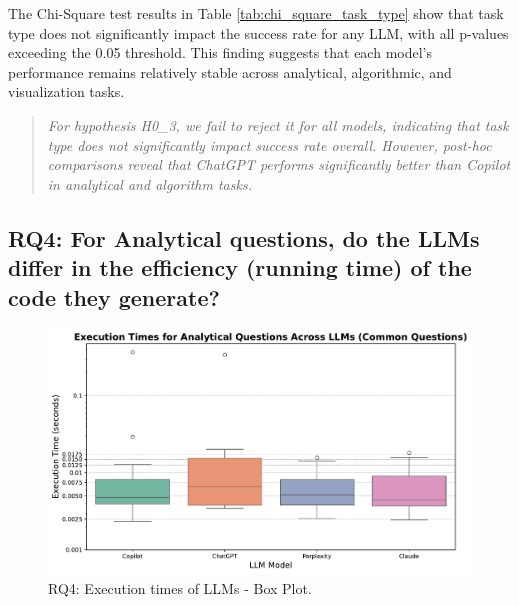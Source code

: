 \documentclass[conference]{IEEEtran}
\begin{document}
The Chi-Square test results in Table \ref{tab:chi_square_task_type} show that task type does not significantly impact the success rate for any LLM, with all p-values exceeding the 0.05 threshold. This finding suggests that each model’s performance remains relatively stable across analytical, algorithmic, and visualization tasks.


\begin{quote} \textit{For hypothesis H0\_3, we fail to reject it for all models, indicating that task type does not significantly impact success rate overall. However, post-hoc comparisons reveal that ChatGPT performs significantly better than Copilot in analytical and algorithm tasks.} \end{quote}


\subsection{RQ4: For Analytical questions, do the LLMs differ in the efficiency (running time) of the code they generate?}

\begin{figure}[H]
    \centering
    \includegraphics[width=1.0\linewidth]{figures/results/RQ4-common.pdf}
    \caption{RQ4: Execution times of LLMs - Box Plot.}
    \label{fig:rq4}
\end{figure}
\end{document}

